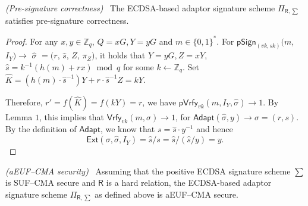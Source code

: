 \documentclass{llncs}
\begin{document}
\begin{lemma}\emph{(Pre-signature correctness)}~\label{Pre-signature correctness} The ECDSA-based adaptor signature scheme $\Pi_{\mathsf{R},\sum}$ satisfies pre-signature correctness.
\end{lemma}

\begin{proof}
For any $x,y\in \mathbb{Z}_q$, $Q=xG,Y=yG$ and $m\in \{0,1\}^*$.  
For $\mathsf{pSign}_{(vk,sk)}(m$, $I_Y)\rightarrow$ $\hat{\sigma}$ $=(r$, $\hat{s}$, $Z$, $\pi_Z)$, it holds that $Y=yG, Z=xY$, $\hat{s}=k^{-1}(h(m)+rx) \bmod q$ for some $k\leftarrow \mathbb{Z}_q$. Set $\hat{K}=(h(m)\cdot\hat{s}^{-1})Y+r\cdot\hat{s}^{-1}Z=kY.$

Therefore, $r'=f(\hat{K})=f(kY)=r$, we have $\mathsf{pVrfy}_{vk}(m,I_Y,\hat{\sigma})\rightarrow 1$. By Lemma $1$, this implies that $\mathsf{Vrfy}_{vk}(m,\sigma)\rightarrow 1$, for $\mathsf{Adapt}(\hat{\sigma}, y)\rightarrow \sigma=(r,s)$. By the definition of $\mathsf{Adapt}$, we know that $s=\hat{s}\cdot y^{-1}$ and hence
$$\mathsf{Ext}(\sigma,\hat{\sigma},I_Y)=\hat{s}/s=\hat{s}/(\hat{s}/y)=y.$$
\end{proof}

\begin{lemma}\emph{(aEUF–CMA security)}~\label{aEUF-CMA security} Assuming that the positive ECDSA signature scheme $\sum$ is SUF–CMA secure and $\mathsf{R}$ is a hard relation, the ECDSA-based adaptor signature scheme $\Pi_{\mathsf{R},\sum}$ as defined above is aEUF–CMA secure.
\end{lemma}
\end{document}
